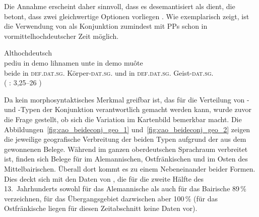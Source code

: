 Die Annahme erscheint daher sinnvoll, dass es desemantisiert als
 dient, die betont, dass zwei gleichwertige Optionen
vorliegen \autocite[425--428]{johannessen2005}. Wie
 exemplarisch zeigt, ist die Verwendung von
 als Konjunktion zumindest mit PPs schon in
vormittelhochdeutscher Zeit möglich.

\begin{exe}
\ex \label{ex:beideintiahd_3_copy}
	\langinfo%
		{Althochdeutsch}
		{}
		{\cite[171]{steinmeyer1916}}\\
	\gll pediu in demo lihnamen unte in demo muôte \\
		beide in \textsc{def.dat.sg.\MascI} Körper-\textsc{dat.sg.\MascI} und in
			\textsc{def.dat.sg.\MascI} Geist-\textsc{dat.sg.\MascI} \\
	\trans {}
		(%
			: 3,25--26%
		)
\end{exe}

Da kein morphosyntaktisches Merkmal greifbar ist, das für die Verteilung von
- und -Typen der Konjunktion verantwortlich gemacht
werden kann, wurde zuvor die Frage gestellt, ob sich die Variation im
Kartenbild bemerkbar macht. Die Abbildungen~\ref{fig:cao_beideconj_geo_1}
und~\ref{fig:cao_beideconj_geo_2} zeigen die jeweilige
geografische Verbreitung der beiden Typen aufgrund der aus
dem \CAO{} gewonnenen Belege. Während  im ganzen
oberdeutschen Sprachraum verbreitet ist, finden sich Belege für
 im Alemannischen, Ostfränkischen
und im Osten des Mittelbairischen. Überall dort kommt es zu einem
Nebeneinander beider Formen. Dies deckt sich mit den Daten von
\citet[627]{ksw2}, die für die zweite Hälfte des 13.~Jahrhunderts sowohl für
das Alemannische als auch für das Bairische 89\,\%
 verzeichnen, für das Übergangsgebiet dazwischen aber 100\,\% (für
das Ostfränkische liegen für diesen Zeitabschnitt keine Daten
vor).

